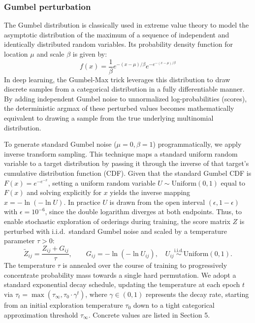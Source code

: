 \documentclass[11pt,a4paper]{article}
\begin{document}
	\subsubsection*{Gumbel perturbation}
	The Gumbel distribution is classically used in extreme value theory to model the asymptotic distribution of the maximum of a sequence of independent and identically distributed random variables. Its probability density function for location $\mu$ and scale $\beta$ is given by: 
	$$f(x) = \frac{1}{\beta} e^{-(x-\mu)/\beta} e^{-e^{-(x-\mu)/\beta}}$$ 
	In deep learning, the Gumbel-Max trick \cite{jang2017} leverages this distribution to draw discrete samples from a categorical distribution in a fully differentiable manner. By adding independent Gumbel noise to unnormalized log-probabilities (scores), the deterministic argmax of these perturbed values becomes mathematically equivalent to drawing a sample from the true underlying multinomial distribution. 
	
	To generate standard Gumbel noise ($\mu=0, \beta=1$) programmatically, we apply inverse transform sampling. This technique maps a standard uniform random variable to a target distribution by passing it through the inverse of that target's cumulative distribution function (CDF). Given that the standard Gumbel CDF is $F(x) = e^{-e^{-x}}$, setting a uniform random variable $U \sim \mathrm{Uniform}(0,1)$ equal to $F(x)$ and solving explicitly for $x$ yields the inverse mapping $x = -\ln(-\ln U)$. In practice $U$ is drawn from the open interval $(\epsilon, 1-\epsilon)$ with $\epsilon = 10^{-6}$, since the double logarithm diverges at both endpoints. Thus, to enable stochastic exploration of orderings during training, the score matrix $Z$ is perturbed with i.i.d.\ standard Gumbel noise and scaled by a temperature parameter $\tau > 0$:
	$$\tilde{Z}_{ij} = \frac{Z_{ij} + G_{ij}}{\tau}, \qquad G_{ij} = -\ln(-\ln U_{ij}), \quad U_{ij} \overset{\text{i.i.d.}}{\sim} \mathrm{Uniform}(0,1).$$
	The temperature $\tau$ is annealed over the course of training to progressively concentrate probability mass towards a single hard permutation. We adopt a standard exponential decay schedule, updating the temperature at each epoch $t$ via $\tau_t = \max(\tau_\infty, \tau_0 \cdot \gamma^t)$, where $\gamma \in (0, 1)$ represents the decay rate, starting from an initial exploration temperature $\tau_0$ down to a tight categorical approximation threshold $\tau_\infty$. Concrete values are listed in Section 5.
	
\end{document}
